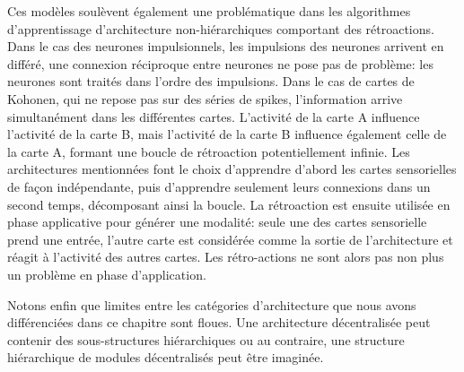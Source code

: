 \documentclass[../main]{subfiles}
\begin{document}
Ces modèles soulèvent également une problématique dans les algorithmes d'apprentissage d'architecture non-hiérarchiques comportant des rétroactions. Dans le cas des neurones impulsionnels, les impulsions des neurones arrivent en différé, une connexion réciproque entre neurones ne pose pas de problème: les neurones sont traités dans l'ordre des impulsions. Dans le cas de cartes de Kohonen, qui ne repose pas sur des séries de spikes, l'information arrive simultanément dans les différentes cartes. L'activité de la carte A influence l'activité de la carte B, mais l'activité de la carte B influence également celle de la carte A, formant une boucle de rétroaction potentiellement infinie. Les architectures mentionnées font le choix d'apprendre d'abord les cartes sensorielles de façon indépendante, puis d'apprendre seulement leurs connexions dans un second temps, décomposant ainsi la boucle. 
La rétroaction est ensuite utilisée en phase applicative pour générer une modalité: seule une des cartes sensorielle prend une entrée, l'autre carte est considérée comme la sortie de l'architecture et réagit à l'activité des autres cartes. Les rétro-actions ne sont alors pas non plus un problème en phase d'application.

Notons enfin que limites entre les catégories d'architecture que nous avons différenciées dans ce chapitre sont floues. Une architecture décentralisée peut contenir des sous-structures hiérarchiques ou au contraire, une structure hiérarchique de modules décentralisés peut être imaginée.


\end{document}
